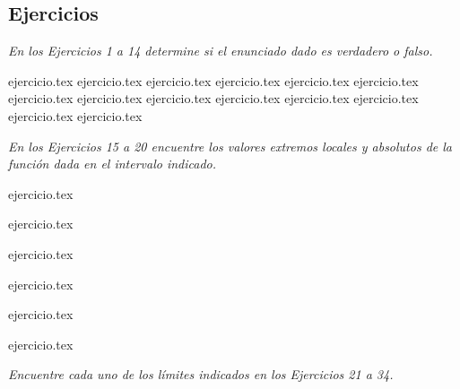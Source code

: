 \subsection*{Ejercicios}

\noindent \textit{En los Ejercicios 1 a 14 determine si el enunciado dado es verdadero o falso.}

\begin{enumerate}
    {ejercicio.tex}
    {ejercicio.tex}
    {ejercicio.tex}
    {ejercicio.tex}
    {ejercicio.tex}
    {ejercicio.tex}
    {ejercicio.tex}
    {ejercicio.tex}
    {ejercicio.tex}
    {ejercicio.tex}
    {ejercicio.tex}
    {ejercicio.tex}
    {ejercicio.tex}
    {ejercicio.tex}
\end{enumerate}

\vspace{1em}
\noindent \textit{En los Ejercicios 15 a 20 encuentre los valores extremos locales y absolutos de la función dada en el intervalo indicado.}

\begin{enumerate}
    \setcounter{enumi}{14}
    \begin{minipage}{0.45\textwidth}
    {ejercicio.tex}
    \addtocounter{enumi}{1}
    {ejercicio.tex}
    \addtocounter{enumi}{1}
    {ejercicio.tex}
    \end{minipage}%
    \begin{minipage}{0.45\textwidth}
    \setcounter{enumi}{15}
    {ejercicio.tex}
    \addtocounter{enumi}{1}
    {ejercicio.tex}
    \addtocounter{enumi}{1}
    {ejercicio.tex}
    \end{minipage}
\end{enumerate}

\vspace{1em}
\noindent \textit{Encuentre cada uno de los límites indicados en los Ejercicios 21 a 34.}

